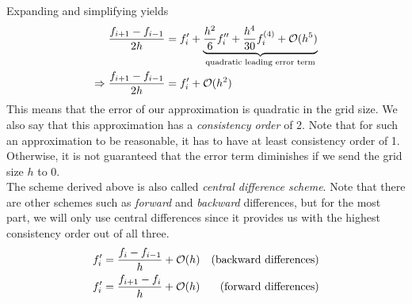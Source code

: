Expanding and simplifying yields
\begin{align}
        \frac{f_{i+1} - f_{i-1}}{2h} &= f_i' + \underbrace{\frac{h^2}{6}f_i'' +
            \frac{h^4}{30}f_i^{(4)} +
        \mathcal{O}(h^5)}_\text{quadratic leading error term}\notag\\
            \Rightarrow \frac{f_{i+1} - f_{i-1}}{2h} &= f_i' + \mathcal{O}(h^2)
\end{align}
This means that the error of our approximation is quadratic in the grid size. 
We also say that this approximation has a \textit{consistency order} of 2. Note that for such an
approximation to be reasonable, it has to have at least consistency order of 1. Otherwise, it is
not guaranteed that the error term diminishes if we send the grid size $h$ to 0.\\
The scheme derived above is also called \textit{central difference scheme}. Note that there are
other schemes such as \textit{forward} and \textit{backward} differences, but for the most part, we
will only use central differences since it provides us with the highest consistency
order out of all three. 
\begin{align}
    f_i' &= \frac{f_i - f_{i-1}}{h} + \mathcal{O}(h)&\textnormal{(backward differences)}\notag\\
    f_i' &= \frac{f_{i+1} - f_i}{h} + \mathcal{O}(h)&\textnormal{(forward differences)}\notag
\end{align}
\newpage\noindent
